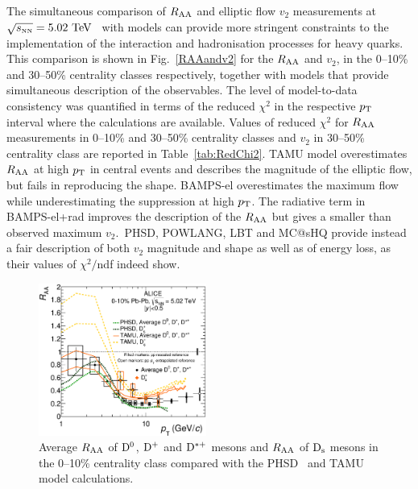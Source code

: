 The simultaneous comparison of $R_{\rm AA}$ and elliptic flow $v_2$ measurements at $\sqrt{s_{\rm \scriptscriptstyle NN}}=5.02~\mathrm{TeV}$~\cite{Acharya:2017qps} with models can provide more stringent constraints to the implementation of the interaction and hadronisation processes for heavy quarks. 
This comparison is shown in Fig.~\ref{RAAandv2} for the $R_{\rm AA}$  
and $v_2$, in the 0--10\% and 30--50\% centrality classes respectively, together with models that provide simultaneous description of the observables.
The level of model-to-data consistency was quantified in terms of the reduced $\chi^2$ in the respective $p_{\rm T}$ interval where the calculations are available.
Values of reduced $\chi^2$ for $R_{\rm AA}$ measurements in 0--10\% and 30--50\% centrality classes and $v_2$ in 30--50\% centrality class are reported in Table~\ref{tab:RedChi2}.
TAMU model overestimates $R_{\rm AA}$ at high $p_{\rm T}$ in central events and describes the magnitude of the elliptic flow, but fails in reproducing the shape.
BAMPS-el overestimates the maximum flow while underestimating the suppression at high $p_{\rm T}$. The radiative term in BAMPS-el+rad improves the description of the $R_{\rm AA}$ but gives a smaller than observed maximum $v_2$.~PHSD, POWLANG, LBT and MC@sHQ provide instead a fair description of both $v_2$ magnitude and shape
as well as of energy loss, as their values of $\chi^2/$ndf indeed show. 
	\iffalse

\begin{figure}[!t]
 \begin{center}
\includegraphics[angle=0, width=0.49\textwidth]{FigCap5/DmesonAverageDs_010_Models_logx_.eps}
 \end{center}
 \caption{Average $R_{\rm AA}$ of ${\rm D^0}$, ${\rm D^+}$ and ${\rm D^{*+}}$ mesons and $R_{\rm AA}$ of ${\rm D_s}$ mesons in the 0--10\% centrality class compared with the PHSD~\cite{Song:2015ykw}  and TAMU~\cite{He:2014cla} model calculations.}
 \label{DandDsRaaWithModels} 
\end{figure} 

